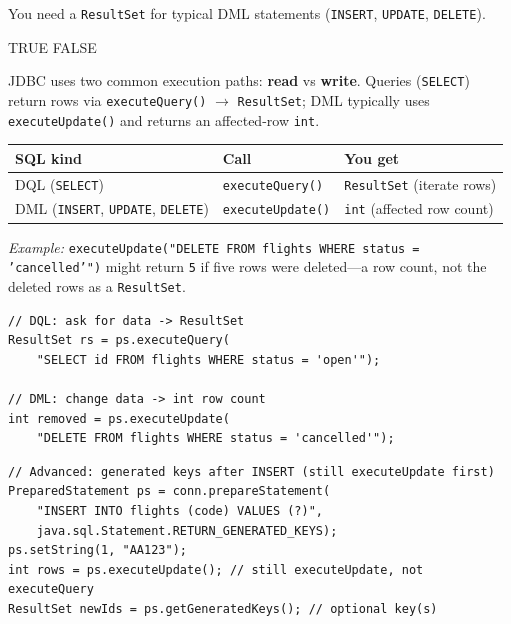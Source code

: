 \question[4]
You need a \texttt{ResultSet} for typical DML statements (\texttt{INSERT}, \texttt{UPDATE}, \texttt{DELETE}).
\begin{choices}
  \choice TRUE
  \CorrectChoice FALSE
\end{choices}
\begin{solution}
  JDBC uses two common execution paths: \textbf{read} vs \textbf{write}. Queries (\texttt{SELECT}) return rows via \texttt{executeQuery()} $\rightarrow$ \texttt{ResultSet}; DML typically uses \texttt{executeUpdate()} and returns an affected-row \texttt{int}.

  \begin{center}
  \footnotesize
  \renewcommand{\arraystretch}{1.15}
  \begin{tabular}{@{}lll@{}}
    \hline
    \textbf{SQL kind} & \textbf{Call} & \textbf{You get} \\
    \hline
    DQL (\texttt{SELECT}) & \texttt{executeQuery()} & \texttt{ResultSet} (iterate rows) \\
    DML (\texttt{INSERT}, \texttt{UPDATE}, \texttt{DELETE}) & \texttt{executeUpdate()} & \texttt{int} (affected row count) \\
    \hline
  \end{tabular}
  \renewcommand{\arraystretch}{1}
  \end{center}

  \noindent\textit{Example:} \texttt{executeUpdate("DELETE FROM flights WHERE status = 'cancelled'")} might return \texttt{5} if five rows were deleted---a row count, not the deleted rows as a \texttt{ResultSet}.

\begin{lstlisting}[style=javaexam]
// DQL: ask for data -> ResultSet
ResultSet rs = ps.executeQuery(
    "SELECT id FROM flights WHERE status = 'open'");

// DML: change data -> int row count
int removed = ps.executeUpdate(
    "DELETE FROM flights WHERE status = 'cancelled'");
\end{lstlisting}

\begin{lstlisting}[style=javaexam]
// Advanced: generated keys after INSERT (still executeUpdate first)
PreparedStatement ps = conn.prepareStatement(
    "INSERT INTO flights (code) VALUES (?)",
    java.sql.Statement.RETURN_GENERATED_KEYS);
ps.setString(1, "AA123");
int rows = ps.executeUpdate(); // still executeUpdate, not executeQuery
ResultSet newIds = ps.getGeneratedKeys(); // optional key(s)
\end{lstlisting}
\end{solution}

